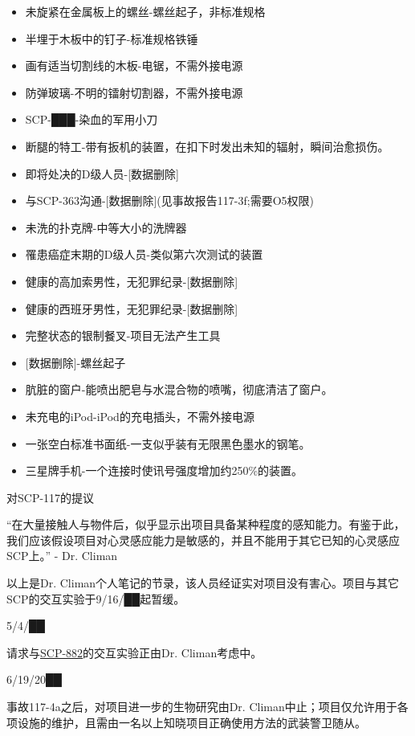 \begin{itemize}
\item 未旋紧在金属板上的螺丝-螺丝起子，非标准规格
\item 半埋于木板中的钉子-标准规格铁锤
\item 画有适当切割线的木板-电锯，不需外接电源
\item 防弹玻璃-不明的镭射切割器，不需外接电源
\item SCP-███-染血的军用小刀
\item 断腿的特工-带有扳机的装置，在扣下时发出未知的辐射，瞬间治愈损伤。
\item 即将处决的D级人员-{[}数据删除]
\item 与SCP-363沟通-{[}数据删除](见事故报告117-3f;需要O5权限)
\item 未洗的扑克牌-中等大小的洗牌器
\item 罹患癌症末期的D级人员-类似第六次测试的装置
\item 健康的高加索男性，无犯罪纪录-{[}数据删除]
\item 健康的西班牙男性，无犯罪纪录-{[}数据删除]
\item 完整状态的银制餐叉-项目无法产生工具
\item {[}数据删除]-螺丝起子
\item 肮脏的窗户-能喷出肥皂与水混合物的喷嘴，彻底清洁了窗户。
\item 未充电的iPod-iPod的充电插头，不需外接电源
\item 一张空白标准书面纸-一支似乎装有无限黑色墨水的钢笔。
\item 三星牌手机-一个连接时使讯号强度增加约250\%的装置。
\end{itemize}

对SCP-117的提议

“在大量接触人与物件后，似乎显示出项目具备某种程度的感知能力。有鉴于此，我们应该假设项目对心灵感应能力是敏感的，并且不能用于其它已知的心灵感应SCP上。” - Dr. Climan

以上是Dr. Climan个人笔记的节录，该人员经证实对项目没有害心。项目与其它SCP的交互实验于9\slash 16\slash ██起暂缓。

 5\slash 4\slash ██

请求与\hyperref[chap:SCP-882]{SCP-882}的交互实验正由Dr. Climan考虑中。

 6\slash 19\slash 20██

事故117-4a之后，对项目进一步的生物研究由Dr. Climan中止；项目仅允许用于各项设施的维护，且需由一名以上知晓项目正确使用方法的武装警卫随从。

